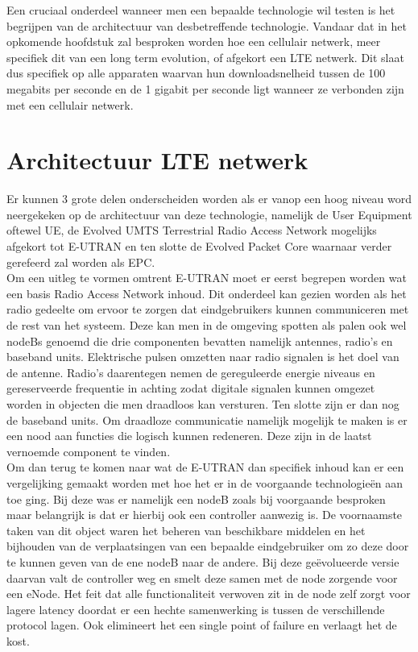 \pagebreak

Een cruciaal onderdeel wanneer men een bepaalde technologie wil testen is het begrijpen van de architectuur van desbetreffende technologie. Vandaar dat in het opkomende hoofdstuk zal besproken worden hoe een cellulair netwerk, meer specifiek dit van een long term evolution, of afgekort een LTE netwerk. Dit slaat dus specifiek op alle apparaten waarvan hun downloadsnelheid tussen de 100 megabits per seconde en de 1 gigabit per seconde ligt wanneer ze verbonden zijn met een cellulair netwerk. \autocite{Volle2024}

\section{Architectuur LTE netwerk}
Er kunnen 3 grote delen onderscheiden worden als er vanop een hoog niveau word neergekeken op de architectuur van deze technologie, namelijk de User Equipment oftewel UE, de Evolved UMTS Terrestrial Radio Access Network mogelijks afgekort tot E-UTRAN en ten slotte de Evolved Packet Core waarnaar verder gerefeerd zal worden als EPC. \autocite{Richard2021}
\\
Om een uitleg te vormen omtrent E-UTRAN moet er eerst begrepen worden wat een basis Radio Access Network inhoud. Dit onderdeel kan gezien worden als het radio gedeelte om ervoor te zorgen dat eindgebruikers kunnen communiceren met de rest van het systeem. Deze kan men in de omgeving spotten als palen ook wel nodeBs genoemd die drie componenten bevatten namelijk antennes, radio's en baseband units. Elektrische pulsen omzetten naar radio signalen is het doel van de antenne. Radio's daarentegen nemen de gereguleerde energie niveaus en gereserveerde frequentie in achting zodat digitale signalen kunnen omgezet worden in objecten die men draadloos kan versturen. Ten slotte zijn er dan nog de baseband units. Om draadloze communicatie namelijk mogelijk te maken is er een nood aan functies die logisch kunnen redeneren. Deze zijn in de laatst vernoemde component te vinden. \autocite{Jones2021}
\\
Om dan terug te komen naar wat de E-UTRAN dan specifiek inhoud kan er een vergelijking gemaakt worden met hoe het er in de voorgaande technologieën aan toe ging. Bij deze was er namelijk een nodeB zoals bij voorgaande besproken maar belangrijk is dat er hierbij ook een controller aanwezig is. De voornaamste taken van dit object waren het beheren van beschikbare middelen en het bijhouden van de verplaatsingen van een bepaalde eindgebruiker om zo deze door te kunnen geven van de ene nodeB naar de andere. Bij deze geëvolueerde versie daarvan valt de controller weg en smelt deze samen met de node zorgende voor een eNode. \autocite{Ghayas2019} Het feit dat alle functionaliteit verwoven zit in de node zelf zorgt voor lagere latency doordat er een hechte samenwerking is tussen de verschillende protocol lagen. Ook elimineert het een single point of failure en verlaagt het de kost. \autocite{Palat2011} \\


